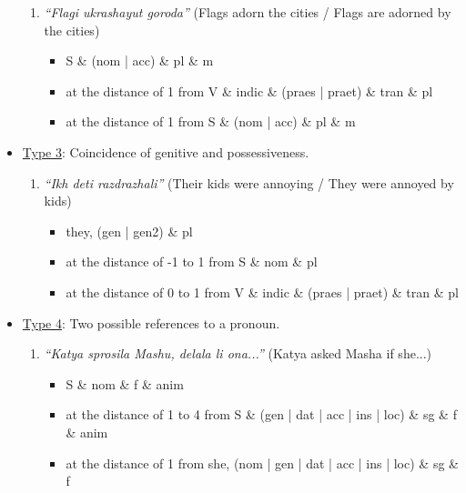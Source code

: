 \documentclass[11pt]{article}
\begin{document}
\begin{itemize}[leftmargin=1em,noitemsep,topsep=0.1pt]
\begin{enumerate}[leftmargin=0.5em,noitemsep,topsep=0.1pt]
        \item \textit{``Flagi ukrashayut goroda''} (Flags adorn the cities / Flags are adorned by the cities)
        
        \begin{itemize}[noitemsep,topsep=0.1pt]
            \item  S \& (nom | acc) \& pl \& m
            \item at the distance of 1 from V \& indic \& (praes | praet) \& tran \& pl
            \item at the distance of 1 from S \& (nom | acc) \& pl \& m
        \end{itemize}
    \end{enumerate}
    
    \item \underline{Type 3}: Coincidence of genitive and possessiveness.
    
    \begin{enumerate}[leftmargin=0.5em,noitemsep,topsep=0.1pt]
        \item \textit{``Ikh deti razdrazhali''} (Their kids were annoying / They were annoyed by kids)
        
        \begin{itemize}[noitemsep,topsep=0.1pt]
            \item they, (gen | gen2) \& pl
            \item at the distance of  -1 to 1 from S \& nom \& pl
            \item at the distance of 0 to 1 from V \& indic \& (praes | praet) \& tran \& pl
        \end{itemize}
    \end{enumerate}

    \item \underline{Type 4}: Two possible references to a pronoun.
    
    \begin{enumerate}[leftmargin=0.5em,noitemsep,topsep=0.1pt]
        \item \textit{``Katya sprosila Mashu, delala li ona...''} (Katya asked Masha if she...)
        
        \begin{itemize}[noitemsep,topsep=0.1pt]
            \item  S \& nom \& f \& anim 
            \item at the distance of 1 to 4 from S \& (gen | dat | acc | ins | loc) \& sg \& f \& anim
            \item at the distance of 1 from she, (nom | gen | dat | acc | ins | loc) \& sg \& f
        \end{itemize}
        

\end{enumerate}
\end{itemize}
\end{document}
